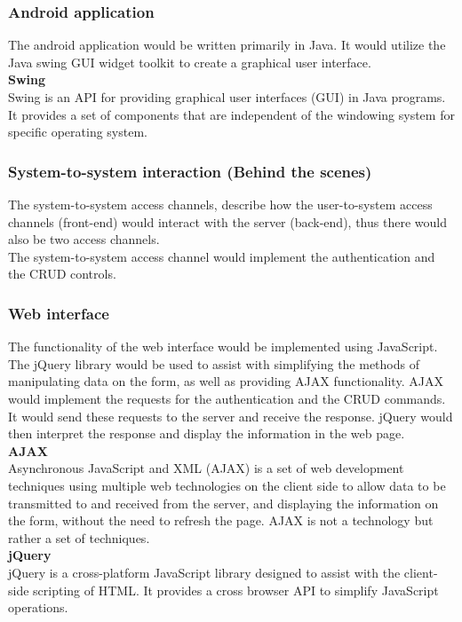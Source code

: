 \documentclass{article}
\begin{document}
\subsubsection*{Android application}
The android application would be written primarily in Java. It would utilize the Java swing GUI widget toolkit to create a graphical user interface. \\
\textbf{Swing}\\
Swing is an API for providing graphical user interfaces (GUI) in Java programs. It provides a set of components that are independent of the windowing system for specific operating system.

\subsubsection*{System-to-system interaction (Behind the scenes)}
The system-to-system access channels, describe how the user-to-system access channels (front-end) would interact with the server (back-end), thus there would also be two access channels.\\
The system-to-system access channel would implement the authentication and the CRUD controls.

\subsubsection*{Web interface}
The functionality of the web interface would be implemented using JavaScript. The jQuery library would be used to assist with simplifying the methods of manipulating data on the form, as well as providing AJAX functionality. AJAX would implement the requests for the authentication and the CRUD commands. It would send these requests to the server and receive the response. jQuery would then interpret the response and display the information in the web page.\\  
\textbf{AJAX}\\
Asynchronous JavaScript and XML (AJAX) is a set of web development techniques using multiple web technologies on the client side to allow data to be transmitted to and received from the server, and displaying the information on the form, without the need to refresh the page. AJAX is not a technology but rather a set of techniques.\\
\textbf{jQuery}\\
jQuery is a cross-platform JavaScript library designed to assist with the client-side scripting of HTML. It provides a cross browser API to simplify JavaScript operations.\\
\end{document}
